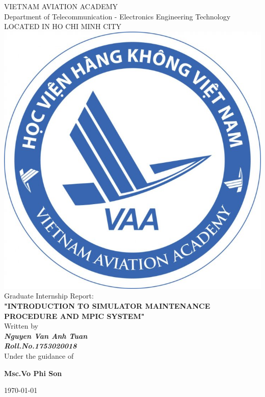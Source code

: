 \documentclass[a4paper,13pt]{report}
\begin{document}
    \begin{titlepage}
        \centering
        
        \LARGE{\textsc{VIETNAM AVIATION ACADEMY}}\\
        \vspace{3mm}
        \normalsize{Department of Telecommunication - Electronics Engineering Technology} \\
        \vspace{3mm}
        \large{LOCATED IN HO CHI MINH CITY} \\
        \vspace{3mm}
        \includegraphics[scale=0.3]{img/logo.png} \\
        \vspace{3mm}
        \normalsize{Graduate Internship Report:} \\
        \vspace{10mm}
        \huge{\textbf{"INTRODUCTION TO SIMULATOR MAINTENANCE PROCEDURE AND MPIC SYSTEM"}} \\ 
        \vspace{20mm}
        \normalsize{Written by} \\ 
        \vspace{3mm}
        \large{\textbf{\textit{Nguyen Van Anh Tuan}}} \\ 
        \vspace{3mm}
        \large{\textbf{\textit{Roll.No.1753020018}}} \\ 
        \vspace{15mm}
        \large{Under the guidance of} \\
        \vspace{7mm}
        \centerline{\textbf{\large{Msc.Vo Phi Son}}} 
        \vspace{3cm}
        \centerline{\today}
    \end{titlepage}
\end{document}
